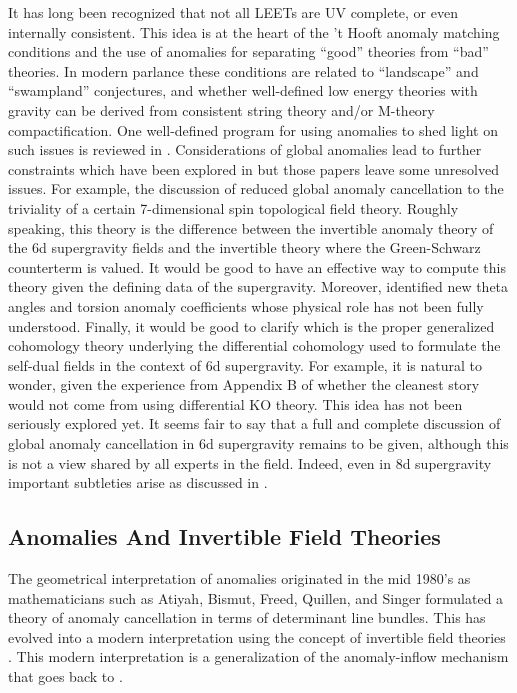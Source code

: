 \documentclass[12pt]{article}
\begin{document}
It has long been recognized that not all LEETs are UV complete,
or even internally consistent. This idea is at the heart of
the 't Hooft anomaly matching conditions and the use of anomalies
for separating ``good'' theories from ``bad'' theories. In modern
parlance these conditions are related to ``landscape'' and
``swampland'' conjectures, and whether well-defined low energy 
theories with gravity can be derived from consistent string theory and/or M-theory 
compactification. One well-defined program for using
anomalies to shed light on such issues is reviewed in  \cite{Taylor:2011wt}. Considerations of global
anomalies lead to further constraints which have been
explored in \cite{Monnier:2017oqd,
Monnier:2018cfa,Monnier:2018nfs,Hsieh:2020jpj}
but those papers leave some unresolved issues. For example, 
the discussion of \cite{Monnier:2018cfa,Monnier:2018nfs} reduced 
global anomaly cancellation to the triviality of a certain 
7-dimensional spin topological field theory. Roughly speaking, this 
theory is the difference between the invertible anomaly theory of the 6d 
supergravity fields and the invertible theory where the Green-Schwarz 
counterterm is valued. It would be good 
to have an effective way to compute this theory given the defining 
data of the supergravity. Moreover, \cite{Monnier:2018cfa,Monnier:2018nfs} 
identified new theta angles and torsion anomaly coefficients whose 
physical role has not been fully understood. Finally, it would be good 
to clarify which is the proper generalized cohomology theory underlying 
the differential cohomology used to formulate the self-dual fields in the 
context of 6d supergravity. For example, it is natural to wonder, 
given the experience from Appendix B of \cite{Freed:2000ta} whether the 
cleanest story would not come from using differential KO theory. This 
idea has not been seriously explored yet. 
It seems fair to say that a full and complete discussion of global anomaly cancellation in
6d supergravity remains to be given, although this is not a view shared by all 
experts in the field. Indeed, even in 8d supergravity important subtleties arise as discussed in 
\cite{Lee:2022spd}. 




\subsection{Anomalies And Invertible Field Theories}

The geometrical interpretation of anomalies originated in the mid 1980's as
mathematicians such as Atiyah, Bismut, Freed, Quillen, and Singer formulated a theory of
anomaly cancellation in terms of determinant line bundles. This has evolved into a modern
interpretation \cite{Freed:2014iua,Freed:2016rqq} using the concept of invertible field theories \cite{Freed:2004yc}. This modern interpretation is a generalization of the anomaly-inflow mechanism that goes back to \cite{Callan:1984sa,Faddeev:1984ung}. 
\end{document}
